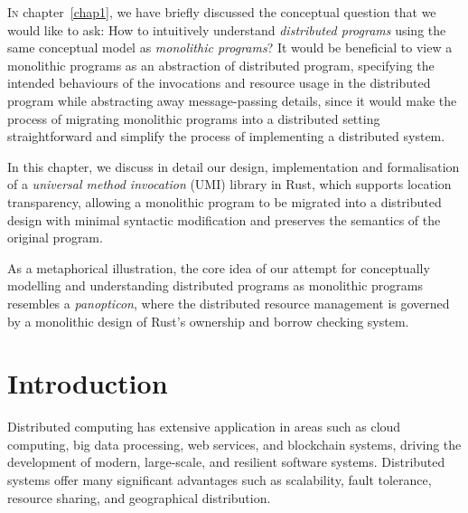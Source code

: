 \noindent
\begin{center}
\vspace{0.3em}
\vspace{-0.7em}
\end{center}
\lettrine{I}{n} chapter~\ref{chap1}, we have briefly discussed the conceptual question that we would like to ask: How to intuitively understand \emph{distributed programs} using the same conceptual model as \emph{monolithic programs}? It would be beneficial to view a monolithic programs as an abstraction of distributed program, specifying the intended behaviours of the invocations and resource usage in the distributed program while abstracting away message-passing details, since it would make the process of migrating monolithic programs into a distributed setting straightforward and simplify the process of implementing a distributed system.

In this chapter, we discuss in detail our design, implementation and formalisation of a \emph{universal method invocation} (UMI) library in Rust, which supports location transparency, allowing a monolithic program to be migrated into a distributed design with minimal syntactic modification and preserves the semantics of the original program.

As a metaphorical illustration, the core idea of our attempt for conceptually modelling and understanding distributed programs as monolithic programs resembles a \emph{panopticon}, where the distributed resource management is governed by a monolithic design of Rust's ownership and borrow checking system.

\section{Introduction}
\label{chap3:introduction}
Distributed computing has extensive application in areas such as cloud computing, big data processing, web services, and blockchain systems, driving the development of modern, large-scale, and resilient software systems. Distributed systems offer many significant advantages such as scalability, fault tolerance, resource sharing, and geographical distribution. 

